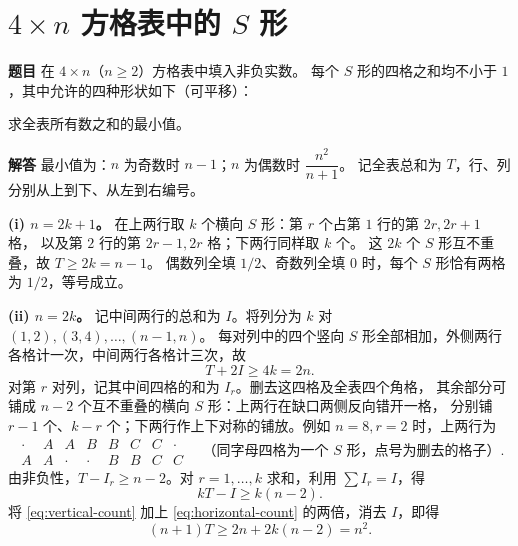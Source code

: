 \documentclass[UTF8,11pt,fontset=fandol]{ctexart}
\numberwithin{equation}{section}
\newcommand{\problem}{\noindent\textbf{题目\quad}}
\newcommand{\solution}{\par\medskip\noindent\textbf{解答\quad}}
\begin{document}
\section{\texorpdfstring{$4\times n$ 方格表中的 $S$ 形}{4×n 方格表中的 S 形}}
\problem
在 $4\times n$（$n\ge2$）方格表中填入非负实数。
每个 $S$ 形的四格之和均不小于 $1$，其中允许的四种形状如下（可平移）：
\begin{center}
\end{center}
求全表所有数之和的最小值。

\solution
最小值为：$n$ 为奇数时 $\boxed{n-1}$；$n$ 为偶数时 $\boxed{\dfrac{n^2}{n+1}}$。
记全表总和为 $T$，行、列分别从上到下、从左到右编号。

\medskip\noindent\textbf{(i) $n=2k+1$。}
在上两行取 $k$ 个横向 $S$ 形：第 $r$ 个占第 $1$ 行的第 $2r,2r+1$ 格，
以及第 $2$ 行的第 $2r-1,2r$ 格；下两行同样取 $k$ 个。
这 $2k$ 个 $S$ 形互不重叠，故 $T\ge2k=n-1$。
偶数列全填 $1/2$、奇数列全填 $0$ 时，每个 $S$ 形恰有两格为 $1/2$，等号成立。

\medskip\noindent\textbf{(ii) $n=2k$。}
记中间两行的总和为 $I$。将列分为 $k$ 对 $(1,2),(3,4),\ldots,(n-1,n)$。
每对列中的四个竖向 $S$ 形全部相加，外侧两行各格计一次，中间两行各格计三次，故
\begin{equation}\label{eq:vertical-count}
 T+2I\ge4k=2n.
\end{equation}
对第 $r$ 对列，记其中间四格的和为 $I_r$。删去这四格及全表四个角格，
其余部分可铺成 $n-2$ 个互不重叠的横向 $S$ 形：上两行在缺口两侧反向错开一格，
分别铺 $r-1$ 个、$k-r$ 个；下两行作上下对称的铺放。例如 $n=8,r=2$ 时，上两行为
\[
\begin{array}{cccccccc}
 \cdot&A&A&B&B&C&C&\cdot\\
 A&A&\cdot&\cdot&B&B&C&C
\end{array}
\quad\text{（同字母四格为一个 $S$ 形，点号为删去的格子）}.
\]
由非负性，$T-I_r\ge n-2$。对 $r=1,\ldots,k$ 求和，利用 $\sum I_r=I$，得
\begin{equation}\label{eq:horizontal-count}
 kT-I\ge k(n-2).
\end{equation}
将 \eqref{eq:vertical-count} 加上 \eqref{eq:horizontal-count} 的两倍，消去 $I$，即得
\[
 (n+1)T\ge2n+2k(n-2)=n^2.
\]
\end{document}

